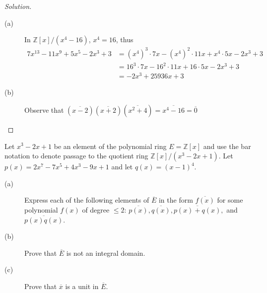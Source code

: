 \documentclass[12pt,leqno]{book}
\numberwithin{equation}{section}
\newcommand{\question}[2] {\vspace{.25in}\noindent\fbox{#1} #2 \vspace{.10in}}
\theoremstyle{definition}
\begin{document}
\begin{proof}[Solution]\indent
 \begin{description}
  \item [(a)] In $\mathbb{Z}[x]/(x^4-16)$, $x^4=16$, thus \begin{align*}7x^{13}-11x^9+5x^5-2x^3+3&=(x^4)^3\cdot7x-(x^4)^2\cdot11x+x^4\cdot5x-2x^3+3\\&=16^3\cdot7x-16^2\cdot11x+16\cdot5x-2x^3+3\\&=-2x^3+25936x+3\end{align*}
  \item [(b)] Observe that $(\overline{x-2})(\overline{x+2})(\overline{x^2+4})=\overline{x^4-16}=\overline{0}$\qedhere
 \end{description}
\end{proof}

\question{17}{Let $x^3-2x+1$ be an element of the polynomial ring $E=\mathbb{Z}[x]$ and use the bar notation to denote passage to the quotient ring $\mathbb{Z}[x]/(x^3-2x+1)$. Let $p(x)=2x^7-7x^5+4x^3-9x+1$ and let $q(x)=(x-1)^4$.}
\begin{description}
 \item [(a)] Express each of the following elements of $\overline{E}$ in the form $\overline{f(x)}$ for some polynomial $f(x)$ of degree $\leq2$: $\overline{p(x)},\overline{q(x)},\overline{p(x)+q(x)},$ and $\overline{p(x)q(x)}$.
 \item [(b)] Prove that $\overline{E}$ is not an integral domain.
 \item [(c)] Prove that $\overline{x}$ is a unit in $\overline{E}$.
\end{description}
\end{document}
